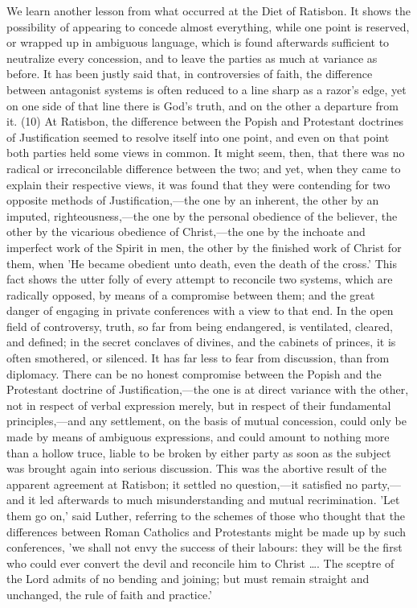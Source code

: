 \documentclass[
]{book}
\begin{document}
We learn another lesson from what occurred at the Diet of Ratisbon. It shows the possibility of appearing to concede almost everything, while one point is reserved, or wrapped up in ambiguous language, which is found afterwards sufficient to neutralize every concession, and to leave the parties as much at variance as before. It has been justly said that, in controversies of faith, the difference between antagonist systems is often reduced to a line sharp as a razor's edge, yet on one side of that line there is God's truth, and on the other a departure from it. (10) At Ratisbon, the difference between the Popish and Protestant doctrines of Justification seemed to resolve itself into one point, and even on that point both parties held some views in common. It might seem, then, that there was no radical or irreconcilable difference between the two; and yet, when they came to explain their respective views, it was found that they were contending for two opposite methods of Justification,---the one by an inherent, the other by an imputed, righteousness,---the one by the personal obedience of the believer, the other by the vicarious obedience of Christ,---the one by the inchoate and imperfect work of the Spirit in men, the other by the finished work of Christ for them, when 'He became obedient unto death, even the death of the cross.' This fact shows the utter folly of every attempt to reconcile two systems, which are radically opposed, by means of a compromise between them; and the great danger of engaging in private conferences with a view to that end. In the open field of controversy, truth, so far from being endangered, is ventilated, cleared, and defined; in the secret conclaves of divines, and the cabinets of princes, it is often smothered, or silenced. It has far less to fear from discussion, than from diplomacy. There can be no honest compromise between the Popish and the Protestant doctrine of Justification,---the one is at direct variance with the other, not in respect of verbal expression merely, but in respect of their fundamental principles,---and any settlement, on the basis of mutual concession, could only be made by means of ambiguous expressions, and could amount to nothing more than a hollow truce, liable to be broken by either party as soon as the subject was brought again into serious discussion. This was the abortive result of the apparent agreement at Ratisbon; it settled no question,---it satisfied no party,---and it led afterwards to much misunderstanding and mutual recrimination. 'Let them go on,' said Luther, referring to the schemes of those who thought that the differences between Roman Catholics and Protestants might be made up by such conferences, 'we shall not envy the success of their labours: they will be the first who could ever convert the devil and reconcile him to Christ \ldots. The sceptre of the Lord admits of no bending and joining; but must remain straight and unchanged, the rule of faith and practice.'
\end{document}
